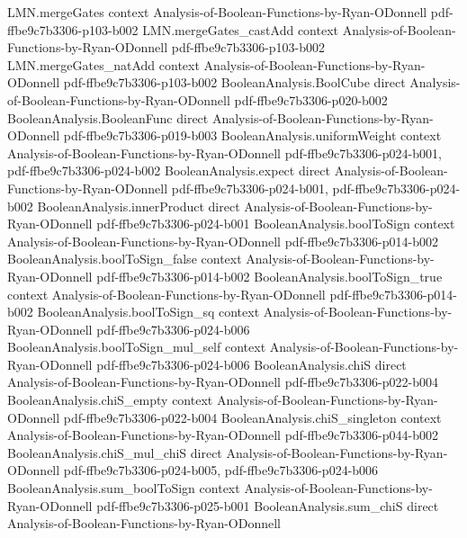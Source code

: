 \begin{lemma}
\proofstep
  {LMN.mergeGates}
  {context}
  {Analysis-of-Boolean-Functions-by-Ryan-ODonnell}
  {pdf-ffbe9c7b3306-p103-b002}
\proofstep
  {LMN.mergeGates_castAdd}
  {context}
  {Analysis-of-Boolean-Functions-by-Ryan-ODonnell}
  {pdf-ffbe9c7b3306-p103-b002}
\proofstep
  {LMN.mergeGates_natAdd}
  {context}
  {Analysis-of-Boolean-Functions-by-Ryan-ODonnell}
  {pdf-ffbe9c7b3306-p103-b002}
\proofstep
  {BooleanAnalysis.BoolCube}
  {direct}
  {Analysis-of-Boolean-Functions-by-Ryan-ODonnell}
  {pdf-ffbe9c7b3306-p020-b002}
\proofstep
  {BooleanAnalysis.BooleanFunc}
  {direct}
  {Analysis-of-Boolean-Functions-by-Ryan-ODonnell}
  {pdf-ffbe9c7b3306-p019-b003}
\proofstep
  {BooleanAnalysis.uniformWeight}
  {context}
  {Analysis-of-Boolean-Functions-by-Ryan-ODonnell}
  {pdf-ffbe9c7b3306-p024-b001,
    pdf-ffbe9c7b3306-p024-b002}
\proofstep
  {BooleanAnalysis.expect}
  {direct}
  {Analysis-of-Boolean-Functions-by-Ryan-ODonnell}
  {pdf-ffbe9c7b3306-p024-b001,
    pdf-ffbe9c7b3306-p024-b002}
\proofstep
  {BooleanAnalysis.innerProduct}
  {direct}
  {Analysis-of-Boolean-Functions-by-Ryan-ODonnell}
  {pdf-ffbe9c7b3306-p024-b001}
\proofstep
  {BooleanAnalysis.boolToSign}
  {context}
  {Analysis-of-Boolean-Functions-by-Ryan-ODonnell}
  {pdf-ffbe9c7b3306-p014-b002}
\proofstep
  {BooleanAnalysis.boolToSign_false}
  {context}
  {Analysis-of-Boolean-Functions-by-Ryan-ODonnell}
  {pdf-ffbe9c7b3306-p014-b002}
\proofstep
  {BooleanAnalysis.boolToSign_true}
  {context}
  {Analysis-of-Boolean-Functions-by-Ryan-ODonnell}
  {pdf-ffbe9c7b3306-p014-b002}
\proofstep
  {BooleanAnalysis.boolToSign_sq}
  {context}
  {Analysis-of-Boolean-Functions-by-Ryan-ODonnell}
  {pdf-ffbe9c7b3306-p024-b006}
\proofstep
  {BooleanAnalysis.boolToSign_mul_self}
  {context}
  {Analysis-of-Boolean-Functions-by-Ryan-ODonnell}
  {pdf-ffbe9c7b3306-p024-b006}
\proofstep
  {BooleanAnalysis.chiS}
  {direct}
  {Analysis-of-Boolean-Functions-by-Ryan-ODonnell}
  {pdf-ffbe9c7b3306-p022-b004}
\proofstep
  {BooleanAnalysis.chiS_empty}
  {context}
  {Analysis-of-Boolean-Functions-by-Ryan-ODonnell}
  {pdf-ffbe9c7b3306-p022-b004}
\proofstep
  {BooleanAnalysis.chiS_singleton}
  {context}
  {Analysis-of-Boolean-Functions-by-Ryan-ODonnell}
  {pdf-ffbe9c7b3306-p044-b002}
\proofstep
  {BooleanAnalysis.chiS_mul_chiS}
  {direct}
  {Analysis-of-Boolean-Functions-by-Ryan-ODonnell}
  {pdf-ffbe9c7b3306-p024-b005,
    pdf-ffbe9c7b3306-p024-b006}
\proofstep
  {BooleanAnalysis.sum_boolToSign}
  {context}
  {Analysis-of-Boolean-Functions-by-Ryan-ODonnell}
  {pdf-ffbe9c7b3306-p025-b001}
\proofstep
  {BooleanAnalysis.sum_chiS}
  {direct}
  {Analysis-of-Boolean-Functions-by-Ryan-ODonnell}

\end{lemma}
